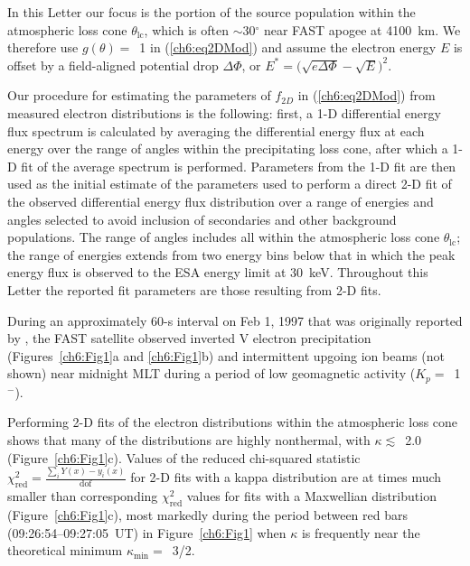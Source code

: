 
  In this Letter our focus is the portion of the source population
  within the atmospheric loss cone $\theta_{\textrm{lc}}$, which is
  often $\sim$30$^\circ$ near FAST apogee at 4100~km. We therefore use
  $g(\theta) =$~1 in (\ref{ch6:eq2DMod}) and assume the electron
  energy $E$ is offset by a field-aligned potential drop $\Delta
  \Phi$, or $E^* = \big( \sqrt{e \Delta \Phi} - \sqrt{E} \big)^2$.

  Our procedure for estimating the parameters of $f_{2D}$ in
  (\ref{ch6:eq2DMod}) from measured electron distributions is the
  following: first, a 1-D differential energy flux spectrum is
  calculated by averaging the differential energy flux at each energy
  over the range of angles within the precipitating loss cone, after
  which a 1-D fit of the average spectrum is performed. Parameters
  from the 1-D fit are then used as the initial estimate of the
  parameters used to perform a direct 2-D fit of the observed
  differential energy flux distribution over a range of energies and
  angles selected to avoid inclusion of secondaries and other
  background populations. The range of angles includes all within the
  atmospheric loss cone $\theta_{\textrm{lc}}$; the range of energies
  extends from two energy bins below that in which the peak energy
  flux is observed to the ESA energy limit at 30~keV. Throughout this
  Letter the reported fit parameters are those resulting from 2-D
  fits.

  During an approximately 60-s interval on Feb 1, 1997 that was
  originally reported by \citet{Elphic1998}, the FAST satellite
  observed inverted V electron precipitation (Figures~\ref{ch6:Fig1}a
  and \ref{ch6:Fig1}b) and intermittent upgoing ion beams (not shown)
  near midnight MLT during a period of low geomagnetic activity ($K_p
  =$~1$^-$).

  Performing 2-D fits of the electron distributions within the
  atmospheric loss cone shows that many of the distributions are
  highly nonthermal, with $\kappa \lesssim$~2.0
  (Figure~\ref{ch6:Fig1}c). Values of the reduced chi-squared
  statistic $\chi^2_{\mathrm{red}} = \frac{\sum_i Y(x) -
    y_i(x)}{\mathrm{dof}}$ for 2-D fits with a kappa distribution are
  at times much smaller than corresponding $\chi^2_{\textrm{red}}$
  values for fits with a Maxwellian distribution
  (Figure~\ref{ch6:Fig1}c), most markedly during the period between
  red bars (09:26:54--09:27:05~UT) in Figure~\ref{ch6:Fig1} when
  $\kappa$ is frequently near the theoretical minimum
  $\kappa_{\mathrm{min}} =$~3/2.


